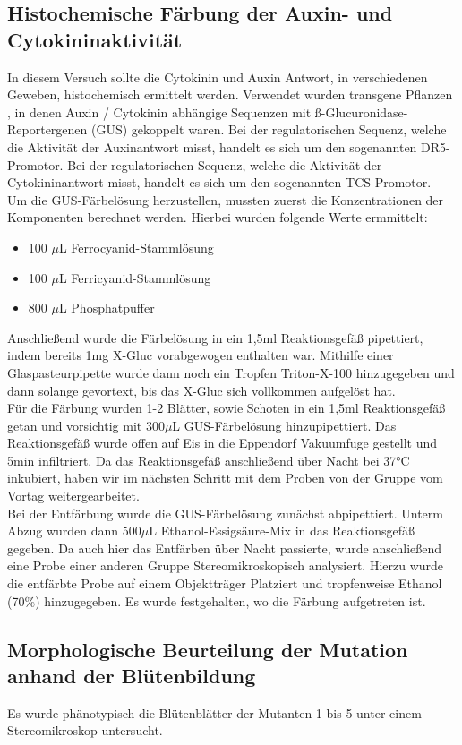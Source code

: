\documentclass[10pt,a4paper]{article}
\begin{document}
	\subsection{Histochemische Färbung der Auxin- und Cytokininaktivität}
	In  diesem Versuch sollte die Cytokinin und Auxin Antwort, in verschiedenen Geweben,  histochemisch ermittelt werden. Verwendet wurden transgene Pflanzen , in denen Auxin / Cytokinin abhängige Sequenzen mit ß-Glucuronidase-Reportergenen (GUS) gekoppelt waren. Bei der regulatorischen Sequenz, welche die Aktivität der Auxinantwort misst, handelt es sich um den sogenannten DR5-Promotor. Bei der regulatorischen Sequenz, welche die Aktivität der Cytokininantwort misst, handelt es sich um den sogenannten TCS-Promotor.\\
	Um die GUS-Färbelösung herzustellen, mussten zuerst die Konzentrationen der Komponenten berechnet werden. Hierbei  wurden folgende  Werte ermmittelt:
	\begin{itemize}
		\item 100 $\mu$L Ferrocyanid-Stammlösung
		\item 100 $\mu$L Ferricyanid-Stammlösung
		\item 800 $\mu$L Phosphatpuffer
	\end{itemize}
	Anschließend  wurde  die Färbelösung in ein 1,5ml Reaktionsgefäß pipettiert, indem bereits 1mg  X-Gluc vorabgewogen enthalten war. Mithilfe einer Glaspasteurpipette  wurde dann noch ein Tropfen Triton-X-100 hinzugegeben und dann solange gevortext, bis das X-Gluc sich vollkommen  aufgelöst hat.\\
	Für die Färbung wurden 1-2 Blätter, sowie Schoten in ein 1,5ml Reaktionsgefäß getan und vorsichtig mit 300$\mu$L GUS-Färbelösung hinzupipettiert. Das Reaktionsgefäß wurde offen auf Eis in die  Eppendorf Vakuumfuge gestellt und 5min infiltriert. Da das Reaktionsgefäß anschließend über Nacht bei 37°C inkubiert, haben wir  im nächsten Schritt mit dem Proben  von der Gruppe vom Vortag weitergearbeitet.\\
	Bei der Entfärbung wurde die GUS-Färbelösung zunächst abpipettiert. Unterm Abzug wurden dann 500$\mu$L Ethanol-Essigsäure-Mix in das Reaktionsgefäß gegeben. Da auch hier das Entfärben über Nacht passierte, wurde anschließend eine Probe  einer  anderen  Gruppe Stereomikroskopisch analysiert. Hierzu wurde die entfärbte Probe auf einem Objektträger Platziert und tropfenweise Ethanol (70$\%$) hinzugegeben. Es wurde festgehalten, wo die Färbung aufgetreten ist.
	\subsection{Morphologische Beurteilung der Mutation anhand der Blütenbildung}
	Es wurde phänotypisch die Blütenblätter der Mutanten 1 bis 5 unter einem Stereomikroskop untersucht.
	
\end{document}

